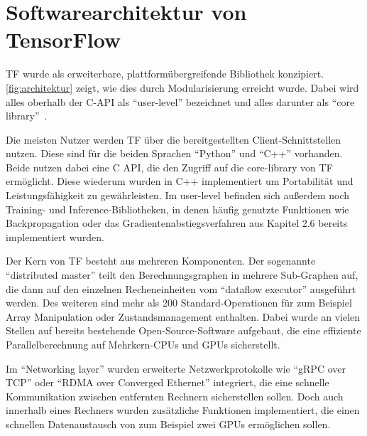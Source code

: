 \section{Softwarearchitektur von TensorFlow}
\Gls{TF} wurde als erweiterbare, plattformübergreifende Bibliothek konzipiert. \autoref{fig:architektur} zeigt, wie dies durch Modularisierung erreicht wurde. Dabei wird alles oberhalb der C-API als "`user-level"' bezeichnet und alles darunter als "`core library"'~\cite{tensorflow2016-whitepaper}.


Die meisten Nutzer werden \gls{TF} über die bereitgestellten Client-Schnittstellen nutzen. Diese sind für die beiden Sprachen "`Python"' und "`C++"' vorhanden. Beide nutzen dabei eine C API, die den Zugriff auf die core-library von \gls{TF} ermöglicht. Diese wiederum wurden in C++ implementiert um Portabilität und Leistungsfähigkeit zu gewährleisten. Im user-level befinden sich außerdem noch Training- und Inference-Bibliotheken, in denen häufig genutzte Funktionen wie Backpropagation oder das Gradientenabstiegsverfahren aus
Kapitel 2.6 bereits implementiert wurden.

Der Kern von \gls{TF} besteht aus mehreren Komponenten. Der sogenannte "`distributed master"' teilt den Berechnungsgraphen in mehrere Sub-Graphen auf, die dann auf den einzelnen Recheneinheiten vom "`dataflow executor"' ausgeführt werden. Des weiteren sind mehr als 200 Standard-Operationen für zum Beispiel Array Manipulation oder Zustandsmanagement enthalten. Dabei wurde an vielen Stellen auf bereits bestehende Open-Source-Software aufgebaut, die eine effiziente Parallelberechnung auf Mehrkern-CPUs und GPUs sicherstellt.

Im "`Networking layer"' wurden erweiterte Netzwerkprotokolle wie "`gRPC over TCP"' oder "`RDMA over Converged Ethernet"' integriert, die eine schnelle Kommunikation zwischen entfernten Rechnern sicherstellen sollen. Doch auch innerhalb eines Rechners wurden zusätzliche Funktionen implementiert, die einen schnellen Datenaustausch von zum Beispiel zwei GPUs ermöglichen sollen.